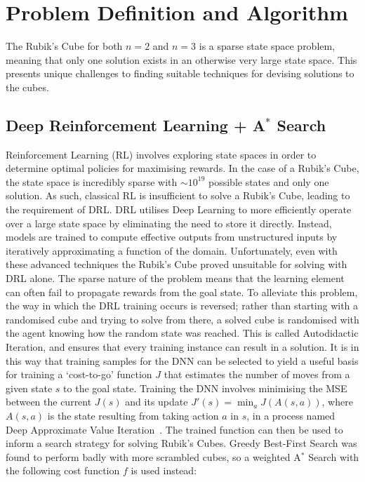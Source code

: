 \documentclass[UKenglish]{svproc}
\begin{document}
\section{Problem Definition and Algorithm}
The Rubik's Cube for both $n=2$ and $n=3$ is a sparse state space problem, meaning that only one solution exists in an otherwise very large state space. This presents unique challenges to finding suitable techniques for devising solutions to the cubes.

\subsection{Deep Reinforcement Learning + A$^{\ast}$ Search}
Reinforcement Learning (RL) involves exploring state spaces in order to determine optimal policies for maximising rewards. In the case of a Rubik's Cube, the state space is incredibly sparse with $\sim 10^{19}$ possible states and only one solution. As such, classical RL is insufficient to solve a Rubik's Cube, leading to the requirement of DRL. DRL utilises Deep Learning to more efficiently operate over a large state space by eliminating the need to store it directly. Instead, models are trained to compute effective outputs from unstructured inputs by iteratively approximating a function of the domain.
Unfortunately, even with these advanced techniques the Rubik's Cube proved unsuitable for solving with DRL alone. The sparse nature of the problem means that the learning element can often fail to propagate rewards from the goal state. To alleviate this problem, the way in which the DRL training occurs is reversed; rather than starting with a randomised cube and trying to solve from there, a solved cube is randomised with the agent knowing how the random state was reached. This is called Autodidactic Iteration, and ensures that every training instance can result in a solution. It is in this way that training samples for the DNN can be selected to yield a useful basis for training a `cost-to-go' function $J$ that estimates the number of moves from a given state $s$ to the goal state. Training the DNN involves minimising the MSE between the current $J(s)$ and its update $J'(s)=\min_aJ(A(s,a))$, where $A(s,a)$ is the state resulting from taking action $a$ in $s$, in a process named Deep Approximate Value Iteration~\cite{agostinelli2019solving}.
The trained function can then be used to inform a search strategy for solving Rubik's Cubes. Greedy Best-First Search was found to perform badly with more scrambled cubes, so a weighted A$^\ast$ Search with the following cost function $f$ is used instead:
\end{document}
